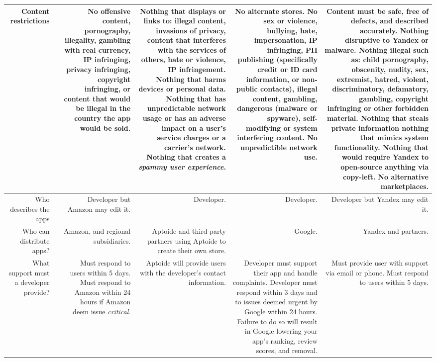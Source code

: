 \documentclass[thesis.tex]{subfiles}
\begin{document}
{{\begin{longtable}{RRRRRR}
      \\\midrule
    Content restrictions
      &
      & No offensive content, pornography, illegality, gambling with real currency, IP infringing, privacy infringing, copyright infringing, or content that would be illegal in the country the app would be sold.
      & Nothing that displays or links to: illegal content, invasions of privacy, content that interferes with the services of others, hate or violence, IP infringement. Nothing that harms devices or personal data.  Nothing that has unpredictable network usage or has an adverse impact on a user's service charges or a carrier's network.  Nothing that creates a \emph{spammy user experience}.
      & No alternate stores. No sex or violence, bullying, hate, impersonation, IP infringing, PII publishing (specifically credit or ID card information, or non-public contacts), illegal content, gambling, dangerous (malware or spyware), self-modifying or system interfering content. No unpredictible network use.
      & Content must be safe, free of defects, and described accurately.  Nothing disruptive to Yandex or malware.  Nothing illegal such as: child pornography, obscenity, nudity, sex, extremist, hatred, violent, discriminatory, defamatory, gambling, copyright infringing or other forbidden material.  Nothing that steals private information nothing that mimics system functionality.  Nothing that would require Yandex to open-source anything via copy-left.  No alternative marketplaces.
      \\\midrule
    Who describes the apps
      &
      & Developer but Amazon may edit it.
      & Developer.
      & Developer.
      & Developer but Yandex may edit it.
      \\\midrule
    Who can distribute apps?
      &
      & Amazon, and regional subsidiaries.
      & Aptoide and third-party partners using Aptoide to create their own store.
      & Google.
      & Yandex and partners.
      \\\midrule
    What support must a developer provide?
      & 
      & Must respond to users within 5 days.  Must respond to Amazon within 24 hours if Amazon deem issue \emph{critical}.
      & Aptoide will provide users with the developer's contact information.
      & Developer must support their app and handle complaints.  Developer must respond within 3 days and to issues deemed urgent by Google within 24 hours.  Failure to do so will result in Google lowering your app's ranking, review scores, and removal.
      & Must provide user with support via email or phone.  Must respond to users within 5 days.

\end{longtable}}}
\end{document}
